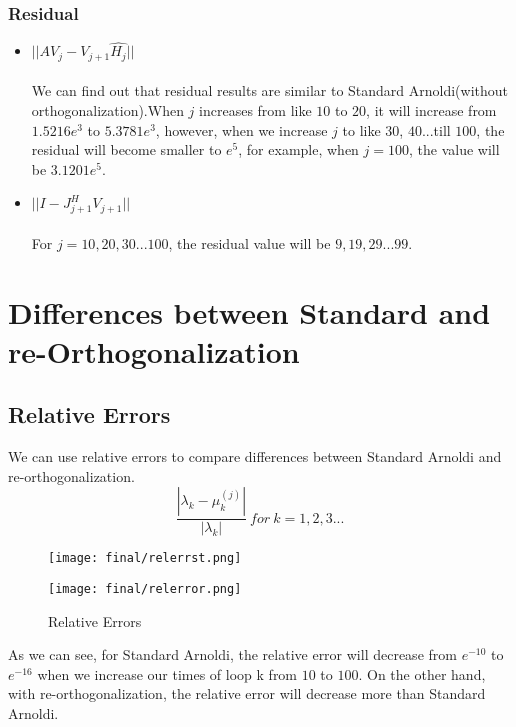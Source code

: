 \documentclass{article}
\begin{document}
\subsubsection{Residual}
\begin{itemize}
    \item $||AV_j-V_{j+1}\hat{H_j}||$\\
    \\
    We can find out that residual results are similar to Standard Arnoldi(without orthogonalization).When $j$ increases from like $10$ to $20$, it will increase from  $1.5216e^3$ to $5.3781e^3$, however, when we increase $j$ to like $30$, $40$...till $100$, the residual will become smaller to $e^5$, for example, when $j=100$, the value will be $3.1201e^5$.
    \item $||I-J^H_{j+1}V_{j+1}||$\\
    \\
    For $j=10,20,30...100$, the residual value will be $9,19,29...99$.
\end{itemize}
\section{Differences between Standard and re-Orthogonalization}
\subsection{Relative Errors}
\begin{flushleft}
We can use relative errors to compare differences between Standard Arnoldi and re-orthogonalization.
\[\frac{|\lambda_k-\mu^{(j)}_k|}{|\lambda_k|}\ for\ k=1,2,3...\]
\end{flushleft}
\begin{figure}[H]
\centering
\begin{minipage}{.5\textwidth}
  \centering
  \texttt{[image: final/relerrst.png]}
  \label{fig:relerr-st}
\end{minipage}%
\begin{minipage}{.5\textwidth}
  \centering
  \texttt{[image: final/relerror.png]}
  \label{fig:relerr-or}
\end{minipage}
\caption*{Relative Errors}
\label{fig:relerr}
\end{figure}
\begin{flushleft}
As we can see, for Standard Arnoldi, the relative error will decrease from $e^{-10}$ to $e^{-16}$ when we increase our times of loop k from $10$ to $100$. On the other hand, with re-orthogonalization, the relative error will decrease more than Standard Arnoldi.
\end{flushleft}
\end{document}
